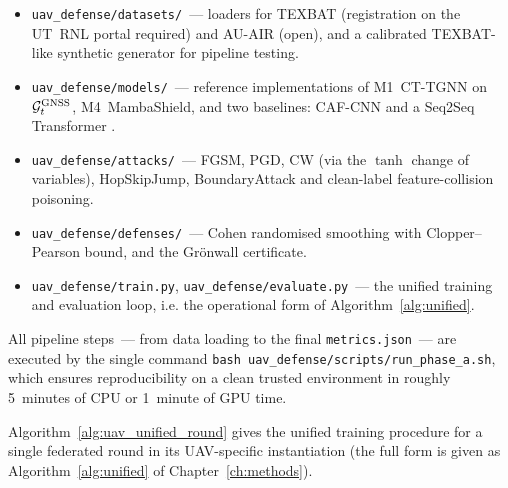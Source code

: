 \begin{itemize}\setlength\itemsep{0.1em}
\item \texttt{uav\_defense/datasets/}~--- loaders for TEXBAT
(registration on the UT~RNL portal required) and AU-AIR (open), and
a calibrated TEXBAT-like synthetic generator for pipeline testing.
\item \texttt{uav\_defense/models/}~--- reference implementations of
\textsf{M1~CT-TGNN} on $\mathcal{G}_t^{\text{GNSS}}$,
\textsf{M4~MambaShield}, and two baselines: CAF-CNN
\cite{borhani_2024_uav} and a Seq2Seq Transformer
\cite{aigner_2025_uav}.
\item \texttt{uav\_defense/attacks/}~--- FGSM, PGD, CW (via the
$\tanh$ change of variables), HopSkipJump, BoundaryAttack and
clean-label feature-collision poisoning.
\item \texttt{uav\_defense/defenses/}~--- Cohen randomised smoothing
with Clopper--Pearson bound, and the Grönwall certificate.
\item \texttt{uav\_defense/train.py},
\texttt{uav\_defense/evaluate.py}~--- the unified training and
evaluation loop, i.e. the operational form of
Algorithm~\ref{alg:unified}.
\end{itemize}

All pipeline steps~--- from data loading to the final
\texttt{metrics.json}~--- are executed by the single command
\texttt{bash uav\_defense/scripts/run\_phase\_a.sh}, which ensures
reproducibility on a clean trusted environment in roughly 5~minutes
of CPU or 1~minute of GPU time.

Algorithm~\ref{alg:uav_unified_round} gives the unified training
procedure for a single federated round in its UAV-specific
instantiation (the full form is given as
Algorithm~\ref{alg:unified} of Chapter~\ref{ch:methods}).

